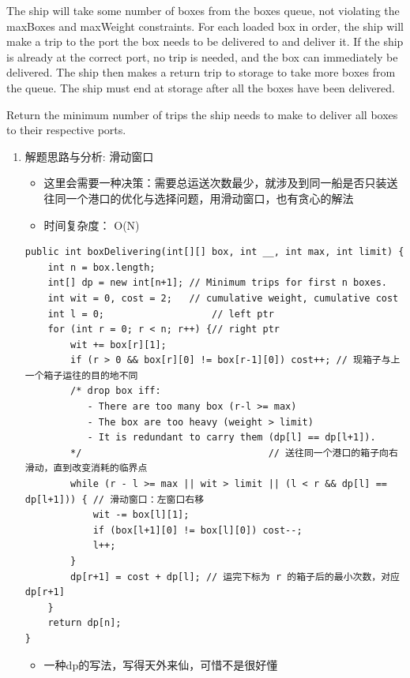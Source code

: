 \documentclass[9pt, b5paaper]{book}
\begin{document}
The ship will take some number of boxes from the boxes queue, not violating the maxBoxes and maxWeight constraints.
For each loaded box in order, the ship will make a trip to the port the box needs to be delivered to and deliver it. If the ship is already at the correct port, no trip is needed, and the box can immediately be delivered.
The ship then makes a return trip to storage to take more boxes from the queue.
The ship must end at storage after all the boxes have been delivered.

Return the minimum number of trips the ship needs to make to deliver all boxes to their respective ports.
\begin{enumerate}
\item 解题思路与分析: 滑动窗口
\label{sec-5-0-14-1}
\begin{itemize}
\item 这里会需要一种决策：需要总运送次数最少，就涉及到同一船是否只装送往同一个港口的优化与选择问题，用滑动窗口，也有贪心的解法
\item 时间复杂度： O(N)
\end{itemize}
\begin{verbatim}
public int boxDelivering(int[][] box, int __, int max, int limit) {
    int n = box.length;
    int[] dp = new int[n+1]; // Minimum trips for first n boxes.
    int wit = 0, cost = 2;   // cumulative weight, cumulative cost
    int l = 0;                   // left ptr
    for (int r = 0; r < n; r++) {// right ptr
        wit += box[r][1];
        if (r > 0 && box[r][0] != box[r-1][0]) cost++; // 现箱子与上一个箱子运往的目的地不同
        /* drop box iff:
           - There are too many box (r-l >= max)
           - The box are too heavy (weight > limit)
           - It is redundant to carry them (dp[l] == dp[l+1]).
        */                                 // 送往同一个港口的箱子向右滑动，直到改变消耗的临界点
        while (r - l >= max || wit > limit || (l < r && dp[l] == dp[l+1])) { // 滑动窗口：左窗口右移
            wit -= box[l][1];
            if (box[l+1][0] != box[l][0]) cost--;
            l++;
        }
        dp[r+1] = cost + dp[l]; // 运完下标为 r 的箱子后的最小次数，对应 dp[r+1]
    }
    return dp[n];
}
\end{verbatim}
\begin{itemize}
\item 一种dp的写法，写得天外来仙，可惜不是很好懂
\end{itemize}
\begin{verbatim}

\end{verbatim}
\end{enumerate}
\end{document}
